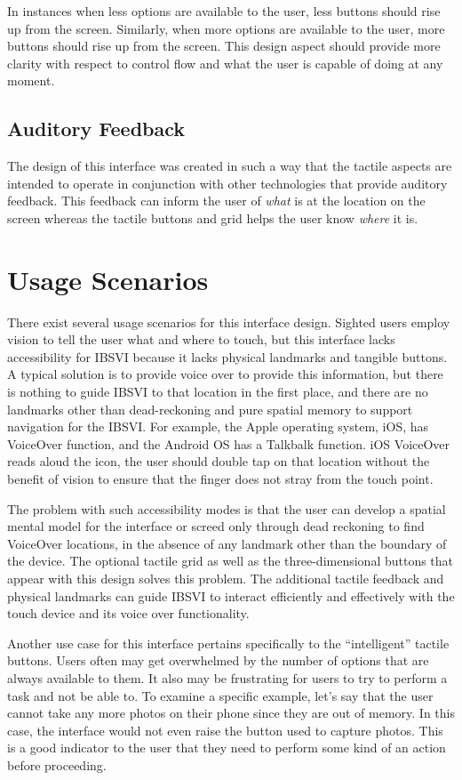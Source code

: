 \documentclass[11pt]{article}
\begin{document}
In instances when less options are available to the user, less buttons should rise up from the screen. Similarly, when more options are available to the user, more buttons should rise up from the screen. This design aspect should provide more clarity with respect to control flow and what the user is capable of doing at any moment.

\subsection{Auditory Feedback}
The design of this interface was created in such a way that the tactile aspects are intended to operate in conjunction with other technologies that provide auditory feedback. This feedback can inform the user of \textit{what} is at the location on the screen whereas the tactile buttons and grid helps the user know \textit{where} it is.


\section{Usage Scenarios}
There exist several usage scenarios for this interface design. Sighted users employ vision to tell the user what and where to touch, but this interface lacks accessibility for IBSVI because it lacks physical landmarks and tangible buttons. A typical solution is to provide voice over to provide this information, but there is nothing to guide IBSVI to that location in the first place, and there are no landmarks other than dead-reckoning and pure spatial memory to support navigation for the IBSVI. For example, the Apple operating system, iOS, has VoiceOver function, and the Android OS has a Talkbalk function. iOS VoiceOver reads aloud the icon, the user should double tap on that location without the benefit of vision to ensure that the finger does not stray from the touch point. 

The problem with such accessibility modes is that the user can develop a spatial mental model for the interface or screed only through dead reckoning to find VoiceOver locations, in the absence of any landmark other than the boundary of the device. The optional tactile grid as well as the three-dimensional buttons that appear with this design solves this problem. The additional tactile feedback and physical landmarks can guide IBSVI to interact efficiently and effectively with the touch device and its voice over functionality.

Another use case for this interface pertains specifically to the ``intelligent'' tactile buttons. Users often may get overwhelmed by the number of options that are always available to them. It also may be frustrating for users to try to perform a task and not be able to. To examine a specific example, let's say that the user cannot take any more photos on their phone since they are out of memory. In this case, the interface would not even raise the button used to capture photos. This is a good indicator to the user that they need to perform some kind of an action before proceeding.
\end{document}
